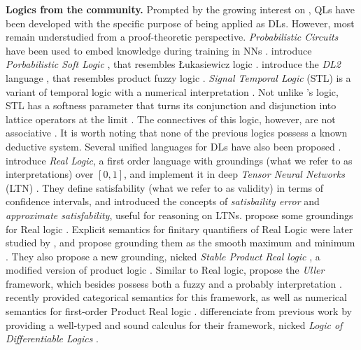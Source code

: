 \textbf{Logics from the \InAI{} community.} Prompted by the growing interest on \InAI{}, QLs have been developed with the specific purpose of being applied as DLs. However, most remain understudied from a proof-theoretic perspective. \emph{Probabilistic Circuits} have been used to embed knowledge during training in NNs \citep{NEURIPS2022_b6089408, braun2025tractablerepresentationlearningprobabilistic}. \citeauthor{kimmig2012short} introduce \emph{Porbabilistic Soft Logic} \citep{kimmig2012short}, that resembles  Łukasiewicz logic \cite{cintula2011handbook,prooffuzzy}. \citeauthor{fischer2019dl2} introduce the \emph{DL2} language \citep{fischer2019dl2}, that resembles product fuzzy logic \citep{cintula2011handbook, prooffuzzy}. \emph{Signal Temporal Logic} (STL) is a variant of temporal logic with a numerical interpretation \citep{varnai2020robustness}. Not unlike \citeauthor{capucci2024quantifiers}'s logic, STL has a softness parameter that turns its conjunction and disjunction into lattice operators at the limit \citep{varnai2020robustness}. The connectives of this logic, however, are not associative \citep{affeldt2024taming}. It is worth noting that none of the previous logics possess a known deductive system. Several unified languages for DLs have also been proposed \citep{badreddine2022logic, van2024uller, slusarz2023logic}. \citeauthor{serafini2016logic} introduce \emph{Real Logic}, a first order language with groundings (what we refer to as interpretations) over $[0,1]$, and implement it in deep \emph{Tensor Neural Networks} (LTN) \cite{badreddine2022logic}.   
They define satisfability (what we refer to as validity) in terms of confidence intervals, and introduced the concepts of \emph{satisbaility error} and \emph{approximate satisfability}, useful for reasoning on LTNs.  \citeauthor{van2022analyzing} propose some groundings for Real logic \citep{van2022analyzing}. Explicit semantics for finitary quantifiers of Real Logic were later studied by \citeauthor{badreddine2022logic}, and propose grounding them as the smooth maximum and minimum \citep{badreddine2022logic}. They also propose a new grounding, nicked \emph{Stable Product Real logic} \citep{badreddine2022logic}, a modified version of product logic \citep{van2022analyzing}. Similar to Real logic, \citeauthor{van2024uller} propose the \emph{Uller} framework, which besides possess both a fuzzy and a probably interpretation \citep{van2022analyzing}. \citeauthor{schellhorn2025muller} recently provided categorical semantics for this framework, as well as numerical semantics for first-order Product Real logic \citep{schellhorn2025muller}. \citeauthor{slusarz2023logic} differenciate from previous work by providing a well-typed and sound calculus for their framework, nicked \emph{Logic of Differentiable Logics} \citep{slusarz2023logic}.

